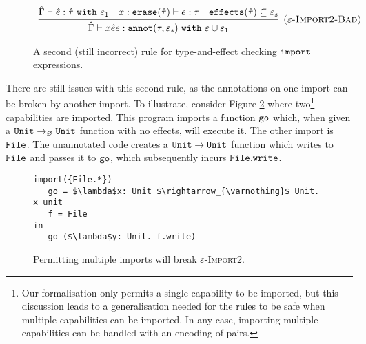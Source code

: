 \begin{figure}

\[
\begin{array}{c}

\infer[\textsc{($\varepsilon$-Import2-Bad)}]
	{ \hat \Gamma \vdash {x}{\hat e}{e}: \kwa{annot}(\tau, \varepsilon_s)~\kw{with} \varepsilon \cup \varepsilon_1 }
	{ \hat \Gamma \vdash \hat e: \hat \tau~\kw{with} \varepsilon_1 & x: \kwa{erase}(\hat \tau) \vdash e: \tau & \kwa{effects}(\hat \tau) \subseteq \varepsilon_s}

\end{array}
\]
\vspace{-0.3cm}
\caption{A second (still incorrect) rule for type-and-effect checking $\mathtt{import}$ expressions.}
\vspace{-0.5cm}
\label{fig:import_rule_2}
\end{figure}

There are still issues with this second rule, as the annotations on one import
can be broken by another import. To illustrate, consider Figure
\ref{fig:rule_import2_counterexample}
where two\footnote{Our formalisation only permits a single capability
  to be imported, but this discussion leads to a generalisation needed
  for the rules to be safe when multiple capabilities can be imported.
  In any case, importing multiple capabilities can be handled with an
  encoding of pairs.} capabilities are imported. This program imports
a function $\mathtt{go}$ which, when given a
$\mathtt{Unit} \rightarrow_{\varnothing} \mathtt{Unit}$ function with no effects, will
execute it. The other import is $\mathtt{File}$. The unannotated code
creates a $\mathtt{Unit} \rightarrow \mathtt{Unit}$ function which writes to
$\mathtt{File}$ and passes it to $\mathtt{go}$, which subsequently incurs
$\mathtt{File.write}$.

\begin{figure}[h]
\vspace{-0.5cm}

\begin{lstlisting}
import({File.*})
   go = $\lambda$x: Unit $\rightarrow_{\varnothing}$ Unit. x unit
   f = File
in
   go ($\lambda$y: Unit. f.write)

\end{lstlisting}

\vspace{-0.5cm}
\caption{Permitting multiple imports will break \textsc{$\varepsilon$-Import2}.}
\vspace{-0.5cm}
\label{fig:rule_import2_counterexample}
\end{figure}

